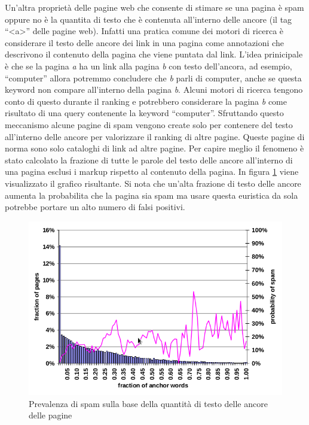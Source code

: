 Un'altra proprietà delle pagine web che consente di stimare se una pagina è spam oppure no è la quantita di testo che è contenuta all'interno delle ancore (il tag ``<a>'' delle pagine web). Infatti una pratica comune dei motori di ricerca è considerare il testo delle ancore dei link in una pagina come annotazioni che descrivono il contenuto della pagina che viene puntata dal link. L'idea prinicipale è che se la pagina \textit{a} ha un link alla pagina \textit{b} con testo dell'ancora, ad esempio, ``computer'' allora potremmo concludere che \textit{b} parli di computer, anche se questa keyword non compare all'interno della pagina \textit{b}. Alcuni motori di ricerca tengono conto di questo durante il ranking e potrebbero considerare la pagina \textit{b} come risultato di una query contenente la keyword ``computer''. Sfruttando questo meccanismo alcune pagine di spam vengono create solo per contenere del testo all'interno delle  ancore per valorizzare il ranking di altre pagine. Queste pagine di norma sono 
solo cataloghi di link ad altre pagine. Per capire meglio il fenomeno è stato calcolato la frazione di tutte le parole del testo delle ancore all'interno di una pagina esclusi i markup rispetto al contenuto della pagina. In figura \ref{fig:fetterly6} viene visualizzato il grafico risultante. Si nota che un'alta frazione di testo delle ancore aumenta la probabilita che la pagina sia spam ma usare questa euristica da sola potrebbe portare un alto numero di falsi positivi.
\begin{figure}[htbp]
\centering
\includegraphics[width=12cm]{immagini/fetterly/fetterly6}
\caption{Prevalenza di spam sulla base della quantità di testo delle ancore delle pagine}
\label{fig:fetterly6}
\end{figure}


